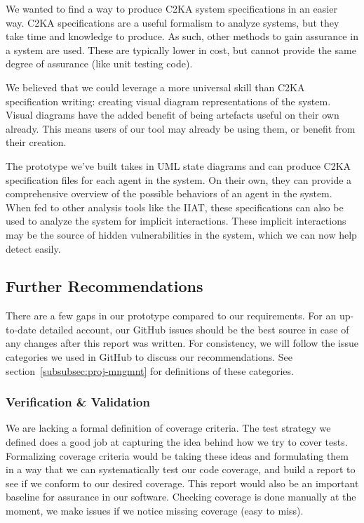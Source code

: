 We wanted to find a way to produce C2KA system specifications in an easier way.
C2KA specifications are a useful formalism to analyze systems, but they take time and knowledge to produce.
As such, other methods to gain assurance in a system are used.
These are typically lower in cost, but cannot provide the same degree of assurance (like unit testing code).

We believed that we could leverage a more universal skill than C2KA specification writing:
creating visual diagram representations of the system.
Visual diagrams have the added benefit of being artefacts useful on their own already.
This means users of our tool may already be using them, or benefit from their creation.

The prototype we've built takes in UML state diagrams and can produce C2KA specification files for each agent in the system.
On their own, they can provide a comprehensive overview of the possible behaviors of an agent in the system.
When fed to other analysis tools like the IIAT,
these specifications can also be used to analyze the system for implicit interactions.
These implicit interactions may be the source of hidden vulnerabilities in the system,
which we can now help detect easily.

\subsection{Further Recommendations}\label{subsec:further-recommendations}
There are a few gaps in our prototype compared to our requirements.
For an up-to-date detailed account, our GitHub issues should be the best source in case of any changes after this report was written.
For consistency, we will follow the issue categories we used in GitHub to discuss our recommendations.
See section~\ref{subsubsec:proj-mngmnt} for definitions of these categories.

\subsubsection{Verification \& Validation}\label{subsubsec:rec-v-v}
We are lacking a formal definition of coverage criteria.
The test strategy we defined does a good job at capturing the idea behind how we try to cover tests.
Formalizing coverage criteria would be taking these ideas and formulating them in a way that we can systematically
test our code coverage, and build a report to see if we conform to our desired coverage.
This report would also be an important baseline for assurance in our software.
Checking coverage is done manually at the moment, we make issues if we notice missing coverage (easy to miss).

